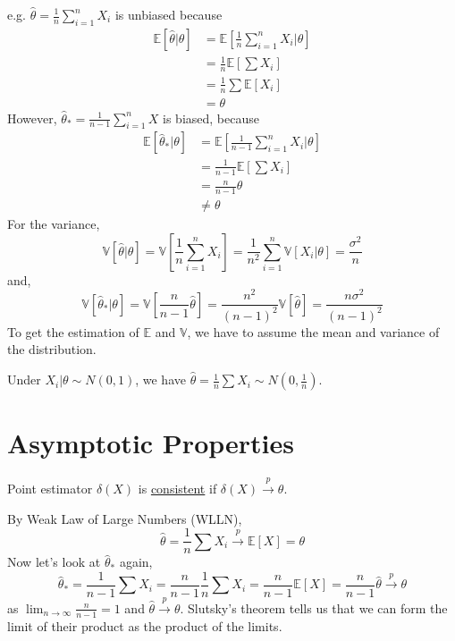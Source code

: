 e.g. $\hat{\theta} = \frac{1}{n} \sum_{i=1}^n X_i$ is unbiased because
\begin{align*}
  \mathbb{E}[\hat{\theta}|\theta] & = \mathbb{E}\left[\frac{1}{n} \sum_{i=1}^n X_i|\theta \right] \\
  & = \frac{1}{n} \mathbb{E}\left[\sum X_i \right]\\
  & = \frac{1}{n} \sum \mathbb{E}[X_i]\\
  & = \theta
\end{align*}
However, $\hat{\theta}_{*} = \frac{1}{n-1} \sum_{i=1}^n X$ is biased, because
\begin{align*}
  \mathbb{E}[\hat{\theta}_{*}|\theta] & = \mathbb{E}\left[\frac{1}{n-1} \sum_{i=1}^n X_i|\theta \right] \\
  & = \frac{1}{n-1} \mathbb{E}\left[\sum X_i \right]\\
  & = \frac{n}{n-1} \theta\\
  & \neq \theta
\end{align*}
For the variance,
\[ \mathbb{V}[\hat{\theta}|\theta] = \mathbb{V}\left[\frac{1}{n} \sum_{i=1}^n X_i \right] = \frac{1}{n^2} \sum_{i=1}^n \mathbb{V}[X_i|\theta] = \frac{\sigma^2}{n} \]
and,
\[ \mathbb{V}[\hat{\theta}_{*}|\theta] = \mathbb{V}\left[\frac{n}{n-1} \hat{\theta} \right] = \frac{n^2}{(n-1)^2} \mathbb{V}[\hat{\theta}] = \frac{n \sigma^2}{(n-1)^2} \]
To get the estimation of $\mathbb{E}$ and $\mathbb{V}$, we have to assume the mean and variance of the distribution.

Under $X_i|\theta \sim N(0, 1)$, we have $\hat{\theta} = \frac{1}{n} \sum X_i \sim N\left(0, \frac{1}{n} \right)$.

\section{Asymptotic Properties}

\begin{definition}
  Point estimator $\delta(X)$ is \underline{consistent} if $\delta(X) \overset{p}{\rightarrow} \theta$.
\end{definition}

By Weak Law of Large Numbers (WLLN),
\[ \hat{\theta} = \frac{1}{n} \sum X_i \overset{p}{\rightarrow} \mathbb{E}[X] = \theta \]
Now let's look at $\hat{\theta}_{*}$ again,
\[ \hat{\theta}_{*} = \frac{1}{n-1} \sum X_i = \frac{n}{n-1} \frac{1}{n} \sum X_i = \frac{n}{n-1} \mathbb{E}[X] = \frac{n}{n-1} \hat{\theta} \overset{p}{\rightarrow} \theta \]
as $\lim_{n \rightarrow \infty} \frac{n}{n-1} = 1$ and $\hat{\theta} \overset{p}{\rightarrow} \theta$. Slutsky's theorem tells us that we can form the limit of their product as the product of the limits.

